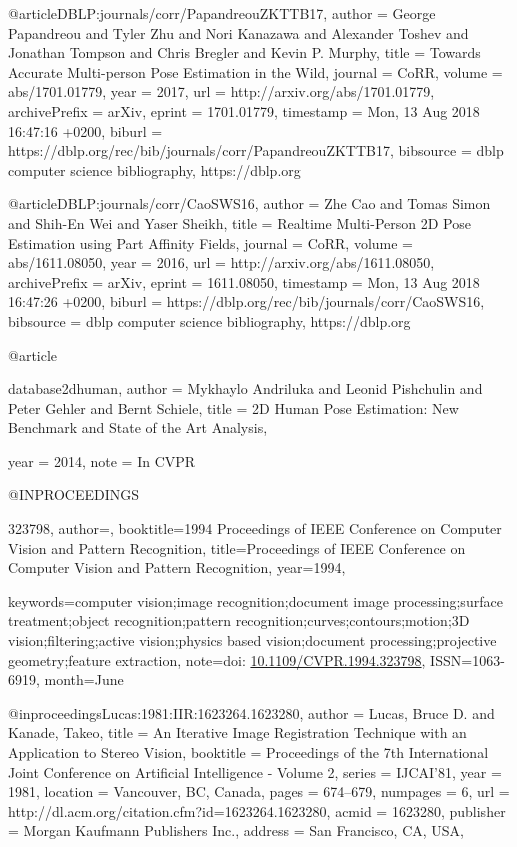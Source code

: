 @article{DBLP:journals/corr/PapandreouZKTTB17,
  author    = {George Papandreou and
               Tyler Zhu and
               Nori Kanazawa and
               Alexander Toshev and
               Jonathan Tompson and
               Chris Bregler and
               Kevin P. Murphy},
  title     = {Towards Accurate Multi-person Pose Estimation in the Wild},
  journal   = {CoRR},
  volume    = {abs/1701.01779},
  year      = {2017},
  url       = {http://arxiv.org/abs/1701.01779},
  archivePrefix = {arXiv},
  eprint    = {1701.01779},
  timestamp = {Mon, 13 Aug 2018 16:47:16 +0200},
  biburl    = {https://dblp.org/rec/bib/journals/corr/PapandreouZKTTB17},
  bibsource = {dblp computer science bibliography, https://dblp.org}
}

@article{DBLP:journals/corr/CaoSWS16,
  author    = {Zhe Cao and
               Tomas Simon and
               Shih{-}En Wei and
               Yaser Sheikh},
  title     = {Realtime Multi-Person 2D Pose Estimation using Part Affinity Fields},
  journal   = {CoRR},
  volume    = {abs/1611.08050},
  year      = {2016},
  url       = {http://arxiv.org/abs/1611.08050},
  archivePrefix = {arXiv},
  eprint    = {1611.08050},
  timestamp = {Mon, 13 Aug 2018 16:47:26 +0200},
  biburl    = {https://dblp.org/rec/bib/journals/corr/CaoSWS16},
  bibsource = {dblp computer science bibliography, https://dblp.org}
}

@article{database2dhuman,
  author    = {Mykhaylo Andriluka and
               Leonid Pishchulin and
               Peter Gehler and
               Bernt Schiele},
  title     = {2D Human Pose Estimation: New Benchmark and State of the Art Analysis},

  year      = {2014},
  note      = {In CVPR}

}

@INPROCEEDINGS{323798, 
    author={}, 
    booktitle={1994 Proceedings of IEEE Conference on Computer Vision and Pattern Recognition}, 
    title={Proceedings of IEEE Conference on Computer Vision and Pattern Recognition}, 
    year={1994}, 
   
    keywords={computer vision;image recognition;document image processing;surface treatment;object recognition;pattern recognition;curves;contours;motion;3D vision;filtering;active vision;physics based vision;document processing;projective geometry;feature extraction}, 
    note={doi: \url{10.1109/CVPR.1994.323798}}, 
    ISSN={1063-6919},
    month={June}
}


@inproceedings{Lucas:1981:IIR:1623264.1623280,
 author = {Lucas, Bruce D. and Kanade, Takeo},
 title = {An Iterative Image Registration Technique with an Application to Stereo Vision},
 booktitle = {Proceedings of the 7th International Joint Conference on Artificial Intelligence - Volume 2},
 series = {IJCAI'81},
 year = {1981},
 location = {Vancouver, BC, Canada},
 pages = {674--679},
 numpages = {6},
 url = {http://dl.acm.org/citation.cfm?id=1623264.1623280},
 acmid = {1623280},
 publisher = {Morgan Kaufmann Publishers Inc.},
 address = {San Francisco, CA, USA},
} 

